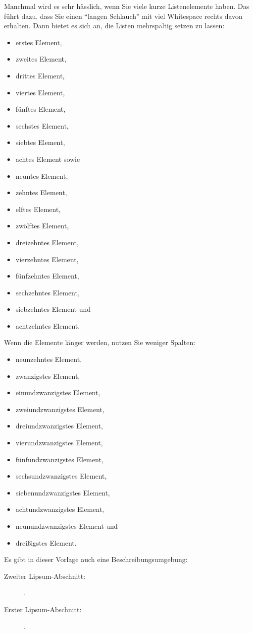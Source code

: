 Manchmal wird es sehr hässlich, wenn Sie viele kurze Listenelemente haben. Das führt dazu, dass Sie einen \enquote{langen Schlauch} mit viel Whitespace rechts davon erhalten. Dann bietet es sich an, die Listen mehrspaltig setzen zu lassen:
\begin{multicols}{3}
\begin{itemize}
    \item erstes Element,
    \item zweites Element,
    \item drittes Element,
    \item viertes Element,
    \item fünftes Element,
    \item sechstes Element,
    \item siebtes Element,
    \item achtes Element sowie
    \item neuntes Element,
    \item zehntes Element,
    \item elftes Element,
    \item zwölftes Element,
    \item dreizehntes Element,
    \item vierzehntes Element,
    \item fünfzehntes Element,
    \item sechzehntes Element,
    \item siebzehntes Element und
    \item achtzehntes Element.
\end{itemize}
\end{multicols}

Wenn die Elemente länger werden, nutzen Sie weniger Spalten:
\begin{multicols}{2}
\begin{itemize}
    \item neunzehntes Element,
    \item zwanzigstes Element,
    \item einundzwanzigstes Element,
    \item zweiundzwanzigstes Element,
    \item dreiundzwanzigstes Element,
    \item vierundzwanzigstes Element,
    \item fünfundzwanzigstes Element,
    \item sechsundzwanzigstes Element,
    \item siebenundzwanzigstes Element,
    \item achtundzwanzigstes Element,
    \item neunundzwanzigstes Element und
    \item dreißigstes Element.
\end{itemize}
\end{multicols}
\noindent Es gibt in dieser Vorlage auch eine Beschreibungsumgebung:
\begin{description}
  \item[Zweiter Lipsum-Abschnitt:] \lipsum[11].
  \item[Erster Lipsum-Abschnitt:] \lipsum[12].
\end{description}


